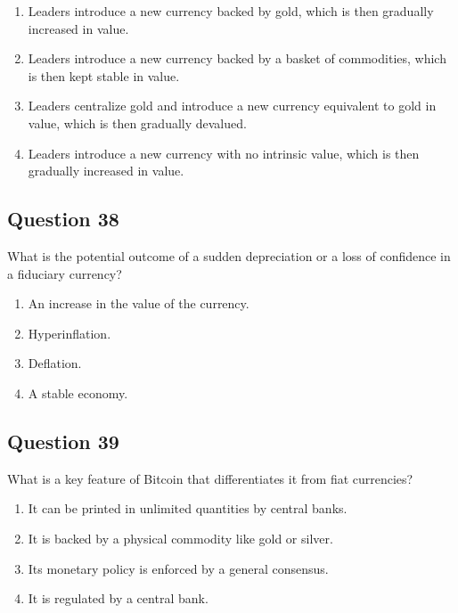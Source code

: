 \documentclass[12pt,a4paper]{article}
\begin{document}
\begin{enumerate}[label=\Alph*., leftmargin=*]
\item Leaders introduce a new currency backed by gold, which is then gradually increased in value.
\item Leaders introduce a new currency backed by a basket of commodities, which is then kept stable in value.
\item Leaders centralize gold and introduce a new currency equivalent to gold in value, which is then gradually devalued.
\item Leaders introduce a new currency with no intrinsic value, which is then gradually increased in value.
\end{enumerate}

\bigskip


\subsection*{Question 38}
What is the potential outcome of a sudden depreciation or a loss of confidence in a fiduciary currency?

\begin{enumerate}[label=\Alph*., leftmargin=*]
\item An increase in the value of the currency.
\item Hyperinflation.
\item Deflation.
\item A stable economy.
\end{enumerate}

\bigskip


\subsection*{Question 39}
What is a key feature of Bitcoin that differentiates it from fiat currencies?

\begin{enumerate}[label=\Alph*., leftmargin=*]
\item It can be printed in unlimited quantities by central banks.
\item It is backed by a physical commodity like gold or silver.
\item Its monetary policy is enforced by a general consensus.
\item It is regulated by a central bank.
\end{enumerate}

\bigskip
\end{document}

